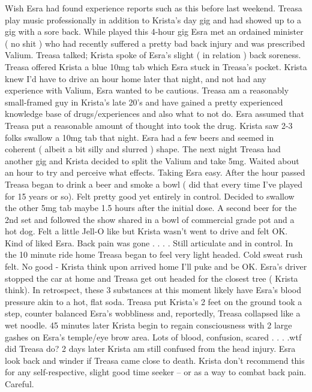 \documentclass[12pt]{book}
\begin{document}
Wish Esra had found experience reports such as this before last weekend. Treasa play music professionally in addition to Krista's day gig and had showed up to a gig with a sore back. While played this 4-hour gig Esra met an ordained minister ( no shit ) who had recently suffered a pretty bad back injury and was prescribed Valium. Treasa talked; Krista spoke of Esra's slight ( in relation ) back soreness. Treasa offered Krista a blue 10mg tab which Esra stuck in Treasa's pocket. Krista knew I'd have to drive an hour home later that night, and not had any experience with Valium, Esra wanted to be cautious. Treasa am a reasonably small-framed guy in Krista's late 20's and have gained a pretty experienced knowledge base of drugs/experiences and also what to not do. Esra assumed that Treasa put a reasonable amount of thought into took the drug. Krista saw 2-3 folks swallow a 10mg tab that night. Esra had a few beers and seemed in coherent ( albeit a bit silly and slurred ) shape. The next night Treasa had another gig and Krista decided to split the Valium and take 5mg. Waited about an hour to try and perceive what effects. Taking Esra easy. After the hour passed Treasa began to drink a beer and smoke a bowl ( did that every time I've played for 15 years or so). Felt pretty good yet entirely in control. Decided to swallow the other 5mg tab maybe 1.5 hours after the initial dose. A second beer for the 2nd set and followed the show shared in a bowl of commercial grade pot and a hot dog. Felt a little Jell-O like but Krista wasn't went to drive and felt OK. Kind of liked Esra. Back pain was gone . . . . Still articulate and in control. In the 10 minute ride home Treasa began to feel very light headed. Cold sweat rush felt. No good - Krista think upon arrived home I'll puke and be OK. Esra's driver stopped the car at home and Treasa get out headed for the closest tree ( Krista think). In retrospect, these 3 substances at this moment likely have Esra's blood pressure akin to a hot, flat soda. Treasa put Krista's 2 feet on the ground took a step, counter balanced Esra's wobbliness and, reportedly, Treasa collapsed like a wet noodle. 45 minutes later Krista begin to regain consciousness with 2 large gashes on Esra's temple/eye brow area. Lots of blood, confusion, scared . . .  .wtf did Treasa do? 2 days later Krista am still confused from the head injury. Esra look back and winder if Treasa came close to death. Krista don't recommend this for any self-respective, slight good time seeker -- or as a way to combat back pain. Careful.
\end{document}
